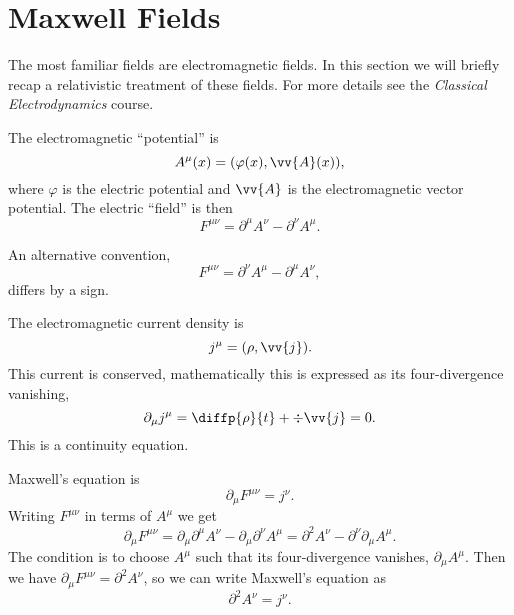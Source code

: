 \documentclass[fleqn]{NotesClass}
\newcommand*{\course}[1]{\textit{#1}}
\newcommand{\dalembertian}{\partial^2}
\begin{document}
    \section{Maxwell Fields}
    The most familiar fields are electromagnetic fields.
    In this section we will briefly recap a relativistic treatment of these fields.
    For more details see the \course{Classical Electrodynamics} course.
    
    The electromagnetic \enquote{potential} is
    \begin{equation}
        A^\mu(x) = (\varphi(x), \vv{A}(x)),
    \end{equation}
    where \(\varphi\) is the electric potential and \(\vv{A}\) is the electromagnetic vector potential.
    The electric \enquote{field} is then
    \begin{equation}
        F^{\mu\nu} = \partial^\mu A^\nu - \partial^\nu A^\mu.
    \end{equation}
    \begin{wrn}
        An alternative convention,
        \begin{equation}
            F^{\mu\nu} = \partial^\nu A^\mu - \partial^\mu A^\nu,
        \end{equation}
        differs by a sign.
    \end{wrn}
    The electromagnetic current density is
    \begin{equation}
        j^\mu = (\rho, \vv{j}).
    \end{equation}
    This current is conserved, mathematically this is expressed as its four-divergence vanishing,
    \begin{equation}
        \partial_\mu j^\mu = \diffp{\rho}{t} + \div\vv{j} = 0.
    \end{equation}
    This is a continuity equation.
    
    Maxwell's equation is
    \begin{equation}
        \partial_\mu F^{\mu\nu} = j^\nu.
    \end{equation}
    Writing \(F^{\mu\nu}\) in terms of \(A^\mu\) we get
    \begin{equation}
        \partial_\mu F^{\mu\nu} = \partial_\mu \partial^\mu A^\nu - \partial_\mu \partial^\nu A^\mu = \dalembertian A^\nu - \partial^\nu \partial_\mu A^\mu.
    \end{equation}
    The  condition is to choose \(A^\mu\) such that its four-divergence vanishes, \(\partial_\mu A^\mu\).
    Then we have \(\partial_\mu F^{\mu\nu} = \dalembertian A^\nu\), so we can write Maxwell's equation as
    \begin{equation}
        \dalembertian A^\nu = j^\nu.
    \end{equation}
    
\end{document}
